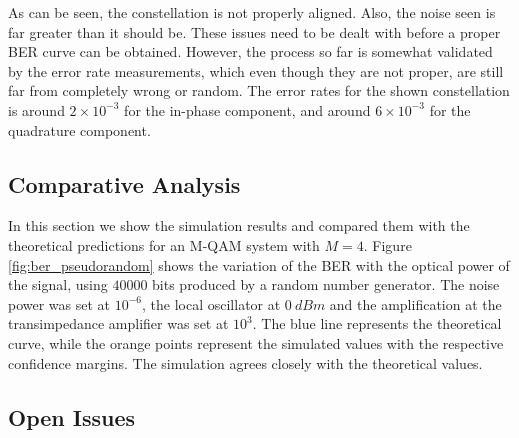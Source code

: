 \begin{refsection}
As can be seen, the constellation is not properly aligned. Also, the noise seen is far greater than it should be. These issues need to be dealt with before a proper BER curve can be obtained. However, the process so far is somewhat validated by the error rate measurements, which even though they are not proper, are still far from completely wrong or random. The error rates for the shown constellation is around $2 \times 10^{-3}$ for the in-phase component, and around $6 \times 10^{-3}$ for the quadrature component.

\subsection{Comparative Analysis}

In this section we show the simulation results and compared them with the theoretical predictions for an M-QAM system with $M=4$. Figure \ref{fig:ber_pseudorandom} shows the variation of the BER with the optical power of the signal, using $40000$ bits produced by a random number generator. The noise power was set at $10^{-6}$, the local oscillator at $0~dBm$ and the amplification at the transimpedance amplifier was set at $10^3$.
The blue line represents the theoretical curve, while the orange points represent the simulated values with the respective confidence margins. The simulation agrees closely with the theoretical values.





\subsection{Open Issues}

\newpage




\clearpage
\printbibliography[heading=subbibliography]
\end{refsection}
\cleardoublepage


